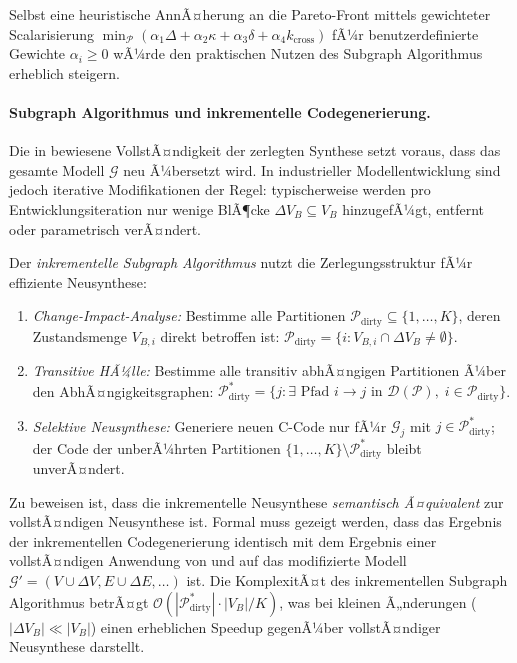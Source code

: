 ﻿\documentclass[12pt,a4paper]{article}
\theoremstyle{definition}
\begin{document}
Selbst eine heuristische AnnÃ¤herung an die Pareto-Front mittels
gewichteter Scalarisierung
$\min_{\mathcal{P}} (\alpha_1 \Delta + \alpha_2 \kappa + \alpha_3 \delta + \alpha_4 k_{\mathrm{cross}})$
fÃ¼r benutzerdefinierte Gewichte $\alpha_i \geq 0$ wÃ¼rde den
praktischen Nutzen des Subgraph Algorithmus erheblich steigern.

\paragraph{Subgraph Algorithmus und inkrementelle Codegenerierung.}
Die in  bewiesene VollstÃ¤ndigkeit der
zerlegten Synthese setzt voraus, dass das gesamte Modell $\mathcal{G}$
neu Ã¼bersetzt wird. In industrieller Modellentwicklung sind jedoch
iterative Modifikationen der Regel: typischerweise werden pro
Entwicklungsiteration nur wenige BlÃ¶cke $\Delta V_B \subseteq V_B$
hinzugefÃ¼gt, entfernt oder parametrisch verÃ¤ndert.

Der \emph{inkrementelle Subgraph Algorithmus} nutzt die Zerlegungsstruktur
fÃ¼r effiziente Neusynthese:

\begin{enumerate}[label=(\roman*), nosep]
  \item \emph{Change-Impact-Analyse:} Bestimme alle Partitionen
        $\mathcal{P}_{\mathrm{dirty}} \subseteq \{1,\ldots,K\}$, deren
        Zustandsmenge $V_{B,i}$ direkt betroffen ist:
        $\mathcal{P}_{\mathrm{dirty}} = \{i : V_{B,i} \cap \Delta V_B \neq \emptyset\}$.

  \item \emph{Transitive HÃ¼lle:} Bestimme alle transitiv abhÃ¤ngigen
        Partitionen Ã¼ber den AbhÃ¤ngigkeitsgraphen:
        $\mathcal{P}_{\mathrm{dirty}}^* = \{j : \exists \text{ Pfad } i \to j
        \text{ in } \mathcal{D}(\mathcal{P}),\; i \in \mathcal{P}_{\mathrm{dirty}}\}$.

  \item \emph{Selektive Neusynthese:} Generiere neuen C-Code nur fÃ¼r
        $\mathcal{G}_j$ mit $j \in \mathcal{P}_{\mathrm{dirty}}^*$;
        der Code der unberÃ¼hrten Partitionen $\{1,\ldots,K\} \setminus
        \mathcal{P}_{\mathrm{dirty}}^*$ bleibt unverÃ¤ndert.
\end{enumerate}

Zu beweisen ist, dass die inkrementelle Neusynthese
\emph{semantisch Ã¤quivalent} zur vollstÃ¤ndigen Neusynthese ist.
Formal muss gezeigt werden, dass das Ergebnis der inkrementellen
Codegenerierung identisch mit dem Ergebnis einer vollstÃ¤ndigen
Anwendung von  und 
auf das modifizierte Modell $\mathcal{G}' = (V \cup \Delta V, E \cup
\Delta E, \ldots)$ ist. Die KomplexitÃ¤t des inkrementellen Subgraph
Algorithmus betrÃ¤gt $\mathcal{O}(|\mathcal{P}_{\mathrm{dirty}}^*| \cdot |V_B|/K)$,
was bei kleinen Ã„nderungen ($|\Delta V_B| \ll |V_B|$) einen erheblichen
Speedup gegenÃ¼ber vollstÃ¤ndiger Neusynthese darstellt.
\end{document}
